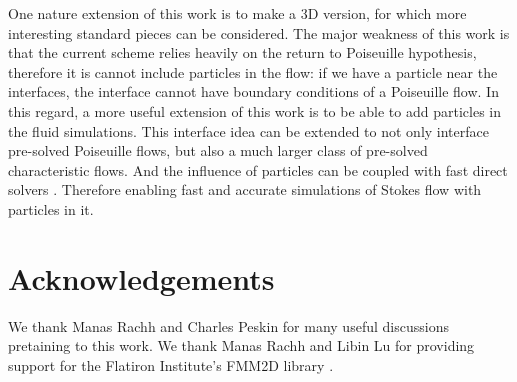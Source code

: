 \documentclass[10pt,twocolumn,letterpaper]{article}
\begin{document}
One nature extension of this work is to make a 3D version, 
for which more interesting standard pieces can be considered.
The major weakness of this work is that the current scheme relies heavily 
on the return to Poiseuille hypothesis, therefore it is cannot
include particles in the flow: 
if we have a particle near the interfaces, the interface cannot have
boundary conditions of a Poiseuille flow. 
In this regard, a more useful extension of this work is to be able to add particles in the fluid simulations. 
This interface idea can be extended to not only interface pre-solved Poiseuille flows, 
but also a much larger class of pre-solved characteristic flows. 
And the influence of particles can be coupled with fast direct solvers \cite{martinssonFastDirectSolvers2019}.
Therefore enabling fast and accurate simulations of Stokes flow with particles in it. 

\section*{Acknowledgements\label{sec:acknowledgements}}

We thank Manas Rachh and Charles Peskin for many useful discussions pretaining to this work. 
We thank Manas Rachh and Libin Lu for providing support for the Flatiron Institute's FMM2D library \cite{FlatironinstituteFmm2d2022}.

\printbibliography
\end{document}
